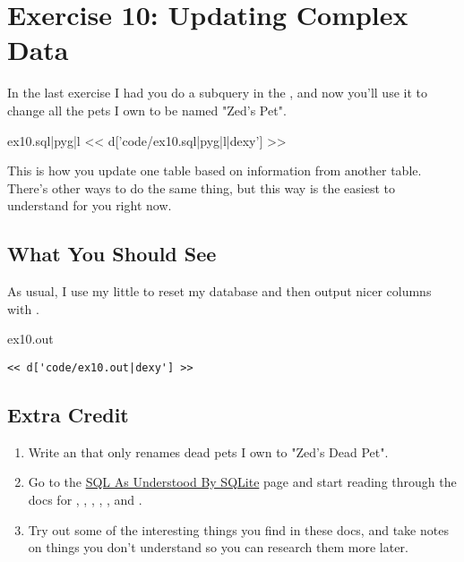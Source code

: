 \chapter{Exercise 10: Updating Complex Data}

In the last exercise I had you do a subquery in the , and now
you'll use it to change all the pets I own to be named "Zed's Pet".

\begin{code}{ex10.sql|pyg|l}
<< d['code/ex10.sql|pyg|l|dexy'] >>
\end{code}

This is how you update one table based on information from another table.
There's other ways to do the same thing, but this way is the easiest to
understand for you right now.

\section{What You Should See}

As usual, I use my little  to reset my database and then output
nicer columns with .

\begin{code}{ex10.out}
\begin{Verbatim}
<< d['code/ex10.out|dexy'] >>
\end{Verbatim}
\end{code}


\section{Extra Credit}

\begin{enumerate}
\item Write an  that only renames dead pets I own to "Zed's Dead Pet".
\item Go to the \href{http://www.sqlite.org/lang.html}{SQL As Understood By SQLite}
    page and start reading through the docs for , , , , , and .
\item Try out some of the interesting things you find in these docs, and take notes
    on things you don't understand so you can research them more later.
\end{enumerate}

